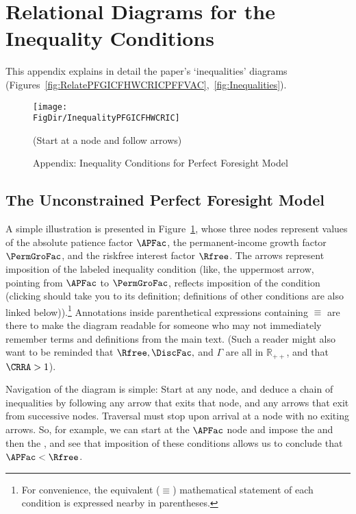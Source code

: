 \documentclass[\econtexRoot/BufferStockTheory]{subfiles}
\begin{document}
\hypertarget{ApndxConditionDiagrams}{}

\section{Relational Diagrams for the Inequality Conditions}\label{sec:ApndxConditionDiagrams}

This appendix explains in detail the paper's `inequalities' diagrams (Figures~\ref{fig:RelatePFGICFHWCRICPFFVAC},~\ref{fig:Inequalities}).

\hypertarget{InequalityPFGICFHWCRIC}{}
\begin{figure}
\centering
\texttt{[image: \\FigDir/InequalityPFGICFHWCRIC]}
\caption{Appendix: Inequality Conditions for Perfect Foresight Model}
\centerline{ (Start at a node and follow arrows)}\label{fig:InequalityPFGICFHWCRIC}
\end{figure}

\subsection{The Unconstrained Perfect Foresight Model}

A simple illustration is presented in Figure~\ref{fig:InequalityPFGICFHWCRIC}, whose three nodes represent values of the absolute patience factor $\APFac$, the permanent-income growth factor $\PermGroFac$, and the riskfree interest factor $\Rfree$.  The arrows represent imposition of the labeled inequality condition  (like,  the uppermost arrow, pointing from {$\APFac$} to $\PermGroFac$, reflects imposition of the {\GICRaw} condition (clicking {\GICRaw} should take you to its definition; definitions of other conditions are also linked below)).\footnote{For convenience, the equivalent ($\equiv$) mathematical statement of each condition is expressed nearby in parentheses.}  Annotations inside parenthetical expressions containing $\equiv$ are there to make the diagram readable for someone who may not immediately remember terms and definitions from the main text.  (Such a reader might also want to be reminded that $\Rfree, \DiscFac, $ and $\Gamma$ are all in $\mathbb{R}_{++}$, and that $\CRRA>1$).

Navigation of the diagram is simple: Start at any node, and deduce a chain of inequalities by following any arrow that exits that node, and any arrows that exit from successive nodes.  Traversal must stop upon arrival at a node with no exiting arrows.  So, for example, we can start at the $\APFac$ node and impose the {\GICRaw} and then the {\FHWC}, and see that imposition of these conditions allows us to conclude that $\APFac < \Rfree$.
\end{document}
